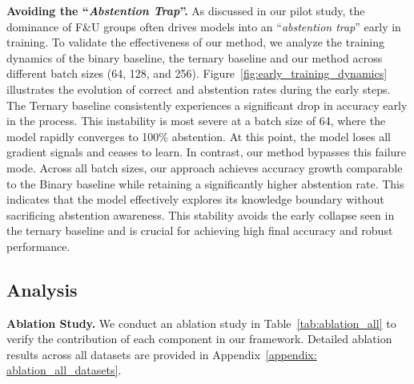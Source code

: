 \documentclass{article} %
\newcommand{\framename}{\textsc{KARL}}
\begin{document}

\noindent
\textbf{Avoiding the ``\textit{Abstention Trap}''.}
\label{sec:trap}
As discussed in our pilot study, the dominance of F\&U groups often drives models into an ``\textit{abstention trap}'' early in training.
To validate the effectiveness of our method, we analyze the training dynamics of the binary baseline, the ternary baseline and our method across different batch sizes (64, 128, and 256).
Figure~\ref{fig:early_training_dynamics} illustrates the evolution of correct and abstention rates during the early steps.
The Ternary baseline consistently experiences a significant drop in accuracy early in the process.
This instability is most severe at a batch size of 64, where the model rapidly converges to 100\% abstention.
At this point, the model loses all gradient signals and ceases to learn.
In contrast, our method bypasses this failure mode.
Across all batch sizes, our approach achieves accuracy growth comparable to the Binary baseline while retaining a significantly higher abstention rate.
This indicates that the model effectively explores its knowledge boundary without sacrificing abstention awareness.
This stability avoids the early collapse seen in the ternary baseline and is crucial for achieving high final accuracy and robust performance.

\subsection{Analysis}
\noindent
\textbf{Ablation Study.}
We conduct an ablation study in Table~\ref{tab:ablation_all} to verify the contribution of each component in our framework. Detailed ablation results across all datasets are provided in Appendix~\ref{appendix: ablation_all_datasets}.
\end{document}
